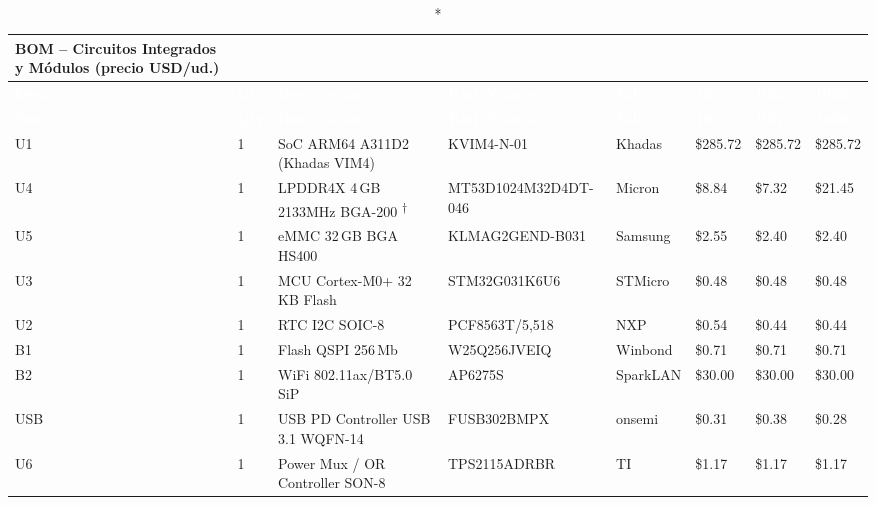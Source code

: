 \begin{longtable}{C{1cm} C{0.5cm} L{2.8cm} L{3.0cm} L{1.8cm} R{1.1cm} R{1.1cm} R{1.1cm}}
  \caption*{BOM -- Circuitos Integrados y Módulos (precio USD/ud.)}\\
  \toprule
  \textcolor{white}{\textbf{Desig.}} &
  \textcolor{white}{\textbf{Qty}} &
  \textcolor{white}{\textbf{Descripción}} &
  \textcolor{white}{\textbf{Part Number}} &
  \textcolor{white}{\textbf{Fab.}} &
  \textcolor{white}{\textbf{1K}} &
  \textcolor{white}{\textbf{10K}} &
  \textcolor{white}{\textbf{100K}} \\
  \midrule
  \endfirsthead
  \toprule
  \textcolor{white}{\textbf{Desig.}} &
  \textcolor{white}{\textbf{Qty}} &
  \textcolor{white}{\textbf{Descripción}} &
  \textcolor{white}{\textbf{Part Number}} &
  \textcolor{white}{\textbf{Fab.}} &
  \textcolor{white}{\textbf{1K}} &
  \textcolor{white}{\textbf{10K}} &
  \textcolor{white}{\textbf{100K}} \\
  \midrule
  \endhead
  \bottomrule
  \endfoot
  U1  & 1 & SoC ARM64 A311D2 (Khadas VIM4)   & KVIM4-N-01            & Khadas   & \$285.72 & \$285.72 & \$285.72 \\
  U4  & 1 & LPDDR4X 4\,GB 2133MHz BGA-200 \textsuperscript{†} & MT53D1024M32D4DT-046 & Micron & \$8.84 & \$7.32 & \$21.45 \\
  U5  & 1 & eMMC 32\,GB BGA HS400             & KLMAG2GEND-B031       & Samsung  & \$2.55 & \$2.40 & \$2.40 \\
  U3  & 1 & MCU Cortex-M0+ 32\,KB Flash       & STM32G031K6U6         & STMicro  & \$0.48 & \$0.48 & \$0.48 \\
  U2  & 1 & RTC I2C SOIC-8                    & PCF8563T/5,518        & NXP      & \$0.54 & \$0.44 & \$0.44 \\
  B1  & 1 & Flash QSPI 256\,Mb                & W25Q256JVEIQ          & Winbond  & \$0.71 & \$0.71 & \$0.71 \\
  B2  & 1 & WiFi 802.11ax/BT5.0 SiP           & AP6275S               & SparkLAN & \$30.00 & \$30.00 & \$30.00 \\
  USB & 1 & USB PD Controller USB 3.1 WQFN-14 & FUSB302BMPX           & onsemi   & \$0.31 & \$0.38 & \$0.28 \\
  U6  & 1 & Power Mux / OR Controller SON-8   & TPS2115ADRBR          & TI       & \$1.17 & \$1.17 & \$1.17 \\

\end{longtable}
